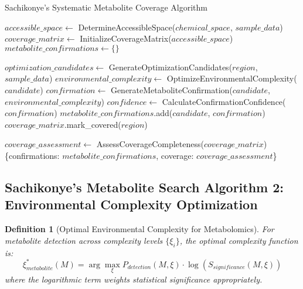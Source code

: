 \documentclass[12pt,a4paper]{article}
\newtheorem{definition}{Definition}
\begin{document}
\begin{algorithm}
\caption{Sachikonye's Systematic Metabolite Coverage Algorithm}
\begin{algorithmic}
    \State $accessible\_space \gets$ DetermineAccessibleSpace($chemical\_space$, $sample\_data$)
    \State $coverage\_matrix \gets$ InitializeCoverageMatrix($accessible\_space$)
    \State $metabolite\_confirmations \gets \{\}$
    
        \State $optimization\_candidates \gets$ GenerateOptimizationCandidates($region$, $sample\_data$)
            \State $environmental\_complexity \gets$ OptimizeEnvironmentalComplexity($candidate$)
            \State $confirmation \gets$ GenerateMetaboliteConfirmation($candidate$, $environmental\_complexity$)
            \State $confidence \gets$ CalculateConfirmationConfidence($confirmation$)
                \State $metabolite\_confirmations$.add($candidate$, $confirmation$)
                \State $coverage\_matrix$.mark\_covered($region$)
            \EndIf
        \EndFor
    \EndFor
    
    \State $coverage\_assessment \gets$ AssessCoverageCompleteness($coverage\_matrix$)
    \State \Return \{confirmations: $metabolite\_confirmations$, coverage: $coverage\_assessment$\}
\EndProcedure
\end{algorithmic}
\end{algorithm}

\subsection{Sachikonye's Metabolite Search Algorithm 2: Environmental Complexity Optimization}

\begin{definition}[Optimal Environmental Complexity for Metabolomics]
For metabolite detection across complexity levels $\{\xi_i\}$, the optimal complexity function is:
\begin{equation}
\xi^*_{metabolite}(M) = \arg\max_\xi P_{detection}(M, \xi) \cdot \log(S_{significance}(M, \xi))
\end{equation}
where the logarithmic term weights statistical significance appropriately.
\end{definition}
\end{document}
